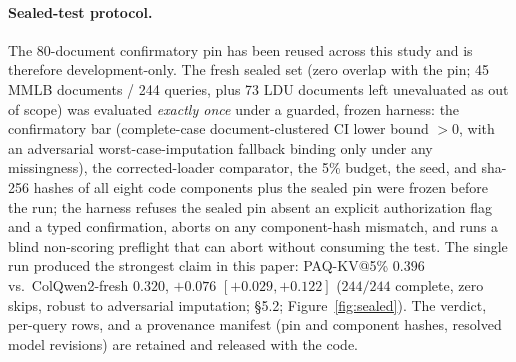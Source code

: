 \documentclass[letterpaper]{article} %
\newcommand{\paqc}{\textsc{PAQ-KV}}
\begin{document}
\paragraph{Sealed-test protocol.} The 80-document confirmatory pin has been reused across this study and is therefore development-only. The fresh sealed set (zero overlap with the pin; 45 MMLB documents / 244 queries, plus 73 LDU documents left unevaluated as out of scope) was evaluated \emph{exactly once} under a guarded, frozen harness: the confirmatory bar (complete-case document-clustered CI lower bound $>0$, with an adversarial worst-case-imputation fallback binding only under any missingness), the corrected-loader comparator, the 5\% budget, the seed, and sha-256 hashes of all eight code components plus the sealed pin were frozen before the run; the harness refuses the sealed pin absent an explicit authorization flag and a typed confirmation, aborts on any component-hash mismatch, and runs a blind non-scoring preflight that can abort without consuming the test. The single run produced the strongest claim in this paper: \paqc{}@5\% $0.396$ vs.\ ColQwen2-fresh $0.320$, $+0.076$ $[+0.029,+0.122]$ ($244/244$ complete, zero skips, robust to adversarial imputation; \S5.2; Figure~\ref{fig:sealed}). The verdict, per-query rows, and a provenance manifest (pin and component hashes, resolved model revisions) are retained and released with the code.
\end{document}

